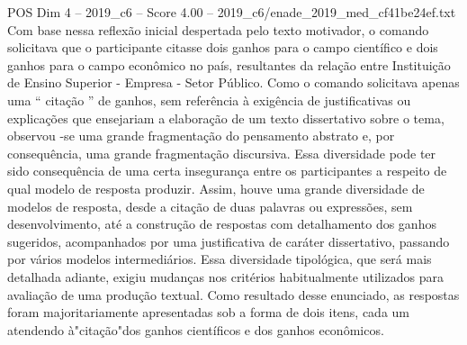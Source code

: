 \begin{textsample}{POS Dim 4 – 2019\_c6 – Score 4.00 – 2019\_c6/enade\_2019\_med\_cf41be24ef.txt}
Com base nessa reflexão inicial despertada pelo texto motivador, o comando solicitava que o participante citasse dois ganhos para o campo científico e dois ganhos para o campo econômico no país, resultantes da relação entre Instituição de Ensino Superior - Empresa - Setor Público.
Como o comando solicitava apenas uma “ citação ” de ganhos, sem referência à exigência de justificativas ou explicações que ensejariam a elaboração de um texto dissertativo sobre o tema, observou -se uma grande fragmentação do pensamento abstrato e, por consequência, uma grande fragmentação discursiva.
Essa diversidade pode ter sido consequência de uma certa insegurança entre os participantes a respeito de qual modelo de resposta produzir.
Assim, houve uma grande diversidade de modelos de resposta, desde a citação de duas palavras ou expressões, sem desenvolvimento, até a construção de respostas com detalhamento dos ganhos sugeridos, acompanhados por uma justificativa de caráter dissertativo, passando por vários modelos intermediários.
Essa diversidade tipológica, que será mais detalhada adiante, exigiu mudanças nos critérios habitualmente utilizados para avaliação de uma produção textual.
Como resultado desse enunciado, as respostas foram majoritariamente apresentadas sob a forma de dois itens, cada um atendendo à"citação"dos ganhos científicos e dos ganhos econômicos.

\end{textsample}
